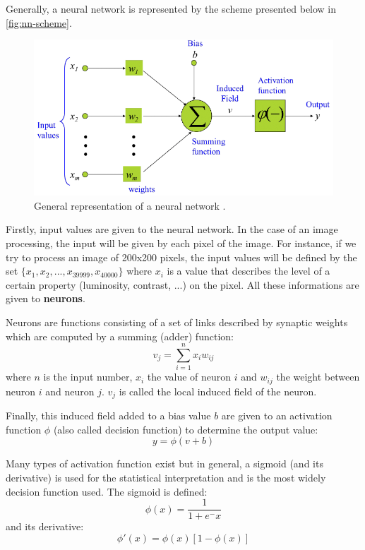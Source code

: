 \documentclass[11pt, openany]{report}
\theoremstyle{plain}
\theoremstyle{definition}
\theoremstyle{remark}
\begin{document}
Generally, a neural network is represented by the scheme presented below in \autoref{fig:nn-scheme}.

\begin{figure}[h]
  \centering
  \includegraphics[scale=0.7]{figures/nn-scheme.png}
  \caption{General representation of a neural network \cite{neuralnet-course-1}.}
  \label{fig:nn-scheme}
\end{figure}

\newpage
Firstly, input values are given to the neural network. In the case of an image processing, the input will be given by each pixel of the image. For instance, if we try to process an image of 200x200 pixels, the input values will be defined by the set $\{x_{1}, x_{2}, ... , x_{39999}, x_{40000}\}$ where $x_{i}$ is a value that describes the level of a certain property (luminosity, contrast, ...) on the pixel. All these informations are given to \textbf{neurons}.

Neurons are functions consisting of a set of links described by synaptic weights which are computed by a summing (adder) function: 
$$ v_{j} = \sum_{i=1}^{n} x_{i} w_{ij} $$ where $n$ is the input number, $x_{i}$ the value of neuron $i$ and $w_{ij}$ the weight between neuron $i$ and neuron $j$. $v_{j}$ is called the local induced field of the neuron. 

Finally, this induced field added to a bias value $b$ are given to an activation function  $\phi$ (also called decision function) to determine the output value: 
$$ y = \phi(v + b)$$

Many types of activation function exist but in general, a sigmoid (and its derivative) is used for the statistical interpretation and is the most widely decision function used. The sigmoid is defined: 
$$ \phi(x) = \frac{1}{1+e^-x} $$ 
and its derivative:
$$ \phi'(x) = \phi(x)[1-\phi(x)] $$ 
\end{document}
